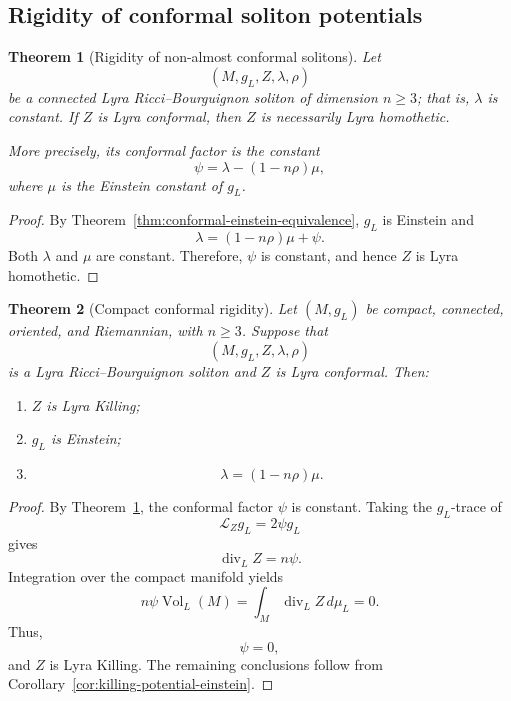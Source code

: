 \documentclass[a4paper,11pt]{article}
\theoremstyle{plain}
\newtheorem{theorem}{Theorem}[section]
\numberwithin{equation}{section}
\begin{document}
\subsection{Rigidity of conformal soliton potentials}
\label{subsec:conformal-potential-rigidity}

\begin{theorem}[Rigidity of non-almost conformal solitons]
	\label{thm:nonalmost-conformal-rigidity}
	Let
	\[
	\left(
	M,g_{L},Z,\lambda,\rho
	\right)
	\]
	be a connected Lyra Ricci--Bourguignon soliton of dimension
	\(n\geq3\); that is, \(\lambda\) is constant. If \(Z\) is Lyra
	conformal, then \(Z\) is necessarily Lyra homothetic.
	
	More precisely, its conformal factor is the constant
	\begin{equation}
		\psi
		=
		\lambda-(1-n\rho)\mu,
		\label{eq:constant-conformal-factor}
	\end{equation}
	where \(\mu\) is the Einstein constant of \(g_{L}\).
\end{theorem}

\begin{proof}
	By Theorem~\ref{thm:conformal-einstein-equivalence},
	\(g_{L}\) is Einstein and
	\[
	\lambda=(1-n\rho)\mu+\psi.
	\]
	Both \(\lambda\) and \(\mu\) are constant. Therefore,
	\(\psi\) is constant, and hence \(Z\) is Lyra homothetic.
\end{proof}

\begin{theorem}[Compact conformal rigidity]
	\label{thm:compact-conformal-rigidity}
	Let \((M,g_{L})\) be compact, connected, oriented, and
	Riemannian, with \(n\geq3\). Suppose that
	\[
	\left(
	M,g_{L},Z,\lambda,\rho
	\right)
	\]
	is a Lyra Ricci--Bourguignon soliton and \(Z\) is Lyra
	conformal. Then:
	\begin{enumerate}
		\item \(Z\) is Lyra Killing;
		\item \(g_{L}\) is Einstein;
		\item
		\begin{equation}
			\lambda
			=
			(1-n\rho)\mu.
			\label{eq:compact-conformal-relation}
		\end{equation}
	\end{enumerate}
\end{theorem}

\begin{proof}
	By Theorem~\ref{thm:nonalmost-conformal-rigidity}, the conformal
	factor \(\psi\) is constant. Taking the \(g_{L}\)-trace of
	\[
	\mathcal L_{Z}g_{L}=2\psi g_{L}
	\]
	gives
	\[
	\operatorname{div}_{L}Z=n\psi.
	\]
	Integration over the compact manifold yields
	\[
	n\psi\operatorname{Vol}_{L}(M)
	=
	\int_{M}\operatorname{div}_{L}Z\,d\mu_{L}
	=
	0.
	\]
	Thus,
	\[
	\psi=0,
	\]
	and \(Z\) is Lyra Killing. The remaining conclusions follow
	from Corollary~\ref{cor:killing-potential-einstein}.
\end{proof}
\end{document}
